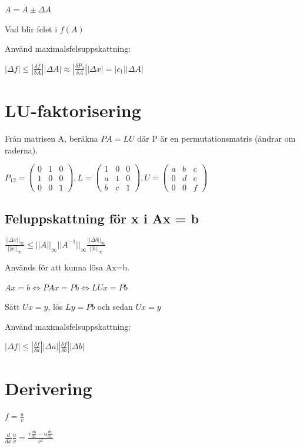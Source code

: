 \documentclass[12pt,a4paper]{article}
\begin{document}
$A = \bar{A} \pm \Delta A $

Vad blir felet i $f(A)$

Använd maximalsfelsuppskattning:

$|\Delta f| \leq |\frac{\delta f}{\delta A}| |\Delta A| \approx |\frac{\delta P_n}{\delta A}| |\Delta x| = |c_1||\Delta A|$ 

\section{LU-faktorisering}
Från matrisen A, beräkna $PA=LU$ där P är en permutationsmatris (ändrar om raderna).

$P_{12} = 
\begin{pmatrix}
0 & 1 & 0 \\
1 & 0 & 0 \\
0 & 0 & 1
\end{pmatrix}
,
L = 
\begin{pmatrix}
1 & 0 & 0 \\
a & 1 & 0 \\
b & c & 1
\end{pmatrix}
,
U = 
\begin{pmatrix}
a & b & c \\
0 & d & e \\
0 & 0 & f
\end{pmatrix}
$


\subsection{Feluppskattning för x i Ax = b}
$\frac{||\Delta x||_\infty}{||x||_\infty} \leq ||A||_\infty ||A^{-1}||_\infty \frac{||\Delta b||_\infty}{||b||_\infty}$


Används för att kunna lösa Ax=b.

$Ax = b \Leftrightarrow PAx = Pb \Leftrightarrow LUx = Pb$

Sätt $Ux = y$, lös $Ly = Pb$ och sedan $Ux = y$

Använd maximalsfelsuppskattning:

$|\Delta f| \leq |\frac{\delta f}{\delta a}| |\Delta a| 
|\frac{\delta f}{\delta b}| |\Delta b|$ 

\section{Derivering}

$f = \frac{u}{v} $

$\frac{d}{dx}\frac{u}{v} = \frac{v\frac{du}{dx}-u\frac{dv}{dx}}{v^2}$
\end{document}
